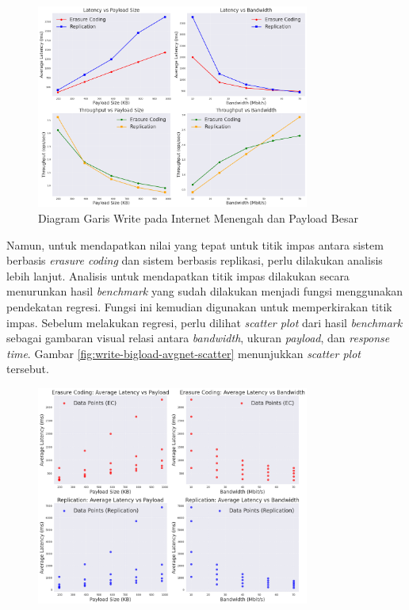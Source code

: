 \begin{enumerate}
  \begin{figure}[!htbp]
    \centering
    \includegraphics[width=0.8\textwidth]{resources/chapter-4/write_bigload_avgnet_line.png}

    \caption{Diagram Garis Write pada Internet Menengah dan Payload Besar}
    \label{fig:write-bigload-avgnet-line}
  \end{figure}
  
  Namun, untuk mendapatkan nilai yang tepat untuk titik impas antara sistem berbasis \textit{erasure coding} dan sistem berbasis replikasi, perlu dilakukan analisis lebih lanjut. Analisis untuk mendapatkan titik impas dilakukan secara menurunkan hasil \textit{benchmark} yang sudah dilakukan menjadi fungsi menggunakan pendekatan regresi. Fungsi ini kemudian digunakan untuk memperkirakan titik impas. Sebelum melakukan regresi, perlu dilihat \textit{scatter plot} dari hasil \textit{benchmark} sebagai gambaran visual relasi antara \textit{bandwidth}, ukuran \textit{payload}, dan \textit{response time}. Gambar \ref{fig:write-bigload-avgnet-scatter} menunjukkan \textit{scatter plot} tersebut.

  \begin{figure}[ht]
    \centering
    \includegraphics[width=0.8\textwidth]{resources/chapter-4/write_bigload_avgnet_scatterplot.png}


\end{figure}
\end{enumerate}

